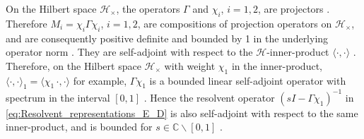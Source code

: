 \documentclass{cmslatex}
\begin{document}
On the Hilbert space $\mathscr{H}_\times$, the operators $\Gamma$ and $\chi_i$,
$i=1,2$, are projectors \cite{Golden:CMP-473}. Therefore 
$M_i=\chi_i\Gamma\chi_i$, $i=1,2$, are compositions of projection operators on
$\mathscr{H}_\times$, and are consequently positive definite and bounded by
1 in the underlying operator norm \cite{Rudin:87}. They are
self-adjoint with respect to the $\mathscr{H}$-inner-product $\langle\cdot,\cdot\rangle$
\cite{Golden:CMP-473}. Therefore, on the Hilbert space $\mathscr{H}_\times$
with weight $\chi_1$ in the inner-product, $\langle\cdot,\cdot\rangle_1=\langle\chi_1\,\cdot,\cdot\rangle$ for
example, $\Gamma\chi_1$ is a bounded linear self-adjoint operator with
spectrum in the interval $[0,1]$ \cite{Golden:CMP-473}. Hence the
resolvent operator $(sI-\Gamma\chi_1)^{-1}$ in
\eqref{eq:Resolvent_representations_E_D} is also self-adjoint with
respect to the same inner-product, and is bounded for
$s\in\mathbb{C}\backslash[0,1]$ \cite{Stone:64}.     
\end{document}
